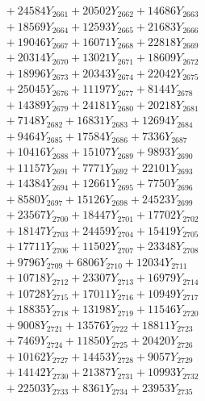 \documentclass[a4paper,10pt]{article}
\begin{document}
{\begin{align}
&\;  + 24584 Y_{2661} + 20502 Y_{2662} + 14686 Y_{2663} \\[0.3ex]
&\;  + 18569 Y_{2664} + 12593 Y_{2665} + 21683 Y_{2666} \\[0.3ex]
&\;  + 19046 Y_{2667} + 16071 Y_{2668} + 22818 Y_{2669} \\[0.5ex]\allowbreak
&\;  + 20314 Y_{2670} + 13021 Y_{2671} + 18609 Y_{2672} \\[0.3ex]
&\;  + 18996 Y_{2673} + 20343 Y_{2674} + 22042 Y_{2675} \\[0.3ex]
&\;  + 25045 Y_{2676} + 11197 Y_{2677} + 8144 Y_{2678} \\[0.3ex]
&\;  + 14389 Y_{2679} + 24181 Y_{2680} + 20218 Y_{2681} \\[0.3ex]
&\;  + 7148 Y_{2682} + 16831 Y_{2683} + 12694 Y_{2684} \\[0.3ex]
&\;  + 9464 Y_{2685} + 17584 Y_{2686} + 7336 Y_{2687} \\[0.3ex]
&\;  + 10416 Y_{2688} + 15107 Y_{2689} + 9893 Y_{2690} \\[0.3ex]
&\;  + 11157 Y_{2691} + 7771 Y_{2692} + 22101 Y_{2693} \\[0.3ex]
&\;  + 14384 Y_{2694} + 12661 Y_{2695} + 7750 Y_{2696} \\[0.3ex]
&\;  + 8580 Y_{2697} + 15126 Y_{2698} + 24523 Y_{2699} \\[0.5ex]\allowbreak
&\;  + 23567 Y_{2700} + 18447 Y_{2701} + 17702 Y_{2702} \\[0.3ex]
&\;  + 18147 Y_{2703} + 24459 Y_{2704} + 15419 Y_{2705} \\[0.3ex]
&\;  + 17711 Y_{2706} + 11502 Y_{2707} + 23348 Y_{2708} \\[0.3ex]
&\;  + 9796 Y_{2709} + 6806 Y_{2710} + 12034 Y_{2711} \\[0.3ex]
&\;  + 10718 Y_{2712} + 23307 Y_{2713} + 16979 Y_{2714} \\[0.3ex]
&\;  + 10728 Y_{2715} + 17011 Y_{2716} + 10949 Y_{2717} \\[0.3ex]
&\;  + 18835 Y_{2718} + 13198 Y_{2719} + 11546 Y_{2720} \\[0.3ex]
&\;  + 9008 Y_{2721} + 13576 Y_{2722} + 18811 Y_{2723} \\[0.3ex]
&\;  + 7469 Y_{2724} + 11850 Y_{2725} + 20420 Y_{2726} \\[0.3ex]
&\;  + 10162 Y_{2727} + 14453 Y_{2728} + 9057 Y_{2729} \\[0.5ex]\allowbreak
&\;  + 14142 Y_{2730} + 21387 Y_{2731} + 10993 Y_{2732} \\[0.3ex]
&\;  + 22503 Y_{2733} + 8361 Y_{2734} + 23953 Y_{2735} \\[0.3ex]

\end{align}}
\end{document}
